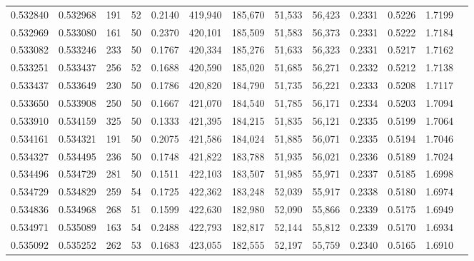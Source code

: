 \begin{tabular}{rrrrrrrrrrrrr}
0.532840 & 0.532968 &   191 &  52 &                                     0.2140 & 419,940 & 185,670 &  51,533 &  56,423 & 0.2331 & 0.5226 & 1.7199 \\
0.532969 & 0.533080 &   161 &  50 &                                     0.2370 & 420,101 & 185,509 &  51,583 &  56,373 & 0.2331 & 0.5222 & 1.7184 \\
0.533082 & 0.533246 &   233 &  50 &                                     0.1767 & 420,334 & 185,276 &  51,633 &  56,323 & 0.2331 & 0.5217 & 1.7162 \\
0.533251 & 0.533437 &   256 &  52 &                                     0.1688 & 420,590 & 185,020 &  51,685 &  56,271 & 0.2332 & 0.5212 & 1.7138 \\
0.533437 & 0.533649 &   230 &  50 &                                     0.1786 & 420,820 & 184,790 &  51,735 &  56,221 & 0.2333 & 0.5208 & 1.7117 \\
0.533650 & 0.533908 &   250 &  50 &                                     0.1667 & 421,070 & 184,540 &  51,785 &  56,171 & 0.2334 & 0.5203 & 1.7094 \\
0.533910 & 0.534159 &   325 &  50 &                                     0.1333 & 421,395 & 184,215 &  51,835 &  56,121 & 0.2335 & 0.5199 & 1.7064 \\
0.534161 & 0.534321 &   191 &  50 &                                     0.2075 & 421,586 & 184,024 &  51,885 &  56,071 & 0.2335 & 0.5194 & 1.7046 \\
0.534327 & 0.534495 &   236 &  50 &                                     0.1748 & 421,822 & 183,788 &  51,935 &  56,021 & 0.2336 & 0.5189 & 1.7024 \\
0.534496 & 0.534729 &   281 &  50 &                                     0.1511 & 422,103 & 183,507 &  51,985 &  55,971 & 0.2337 & 0.5185 & 1.6998 \\
0.534729 & 0.534829 &   259 &  54 &                                     0.1725 & 422,362 & 183,248 &  52,039 &  55,917 & 0.2338 & 0.5180 & 1.6974 \\
0.534836 & 0.534968 &   268 &  51 &                                     0.1599 & 422,630 & 182,980 &  52,090 &  55,866 & 0.2339 & 0.5175 & 1.6949 \\
0.534971 & 0.535089 &   163 &  54 &                                     0.2488 & 422,793 & 182,817 &  52,144 &  55,812 & 0.2339 & 0.5170 & 1.6934 \\
0.535092 & 0.535252 &   262 &  53 &                                     0.1683 & 423,055 & 182,555 &  52,197 &  55,759 & 0.2340 & 0.5165 & 1.6910 \\

\end{tabular}
